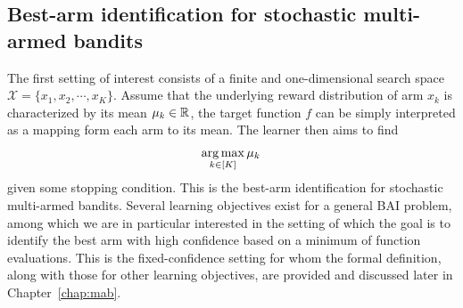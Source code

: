 

\subsection{Best-arm identification for stochastic multi-armed bandits}\label{sec:intro.mab.bai}

The first setting of interest consists of a finite and one-dimensional search space $\mathcal{X} = \{x_1,x_2,\cdots,x_K\}$. Assume that the underlying reward distribution of arm $x_k$ is characterized by its mean $\mu_k\in\mathbb{R}$, the target function $f$ can be simply interpreted as a mapping form each arm to its mean. The learner then aims to find
\begin{align}\label{eq:optim_bai}
    \operatorname*{arg\,max}_{k\in[K]} \mu_k\,
\end{align}
given some stopping condition. This is the best-arm identification for stochastic multi-armed bandits. Several learning objectives exist for a general BAI problem, among which we are in particular interested in the setting of which the goal is to identify the best arm with high confidence based on a minimum of function evaluations. This is the \gls{fixed-confidence setting} for whom the formal definition, along with those for other learning objectives, are provided and discussed later in Chapter~\ref{chap:mab}.


